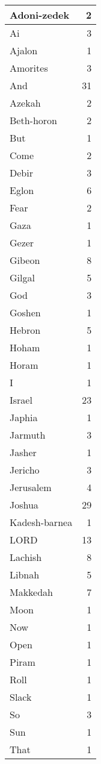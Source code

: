 \begin{center}
\begin{longtable}{l|r}
\hline \hline
\endlastfoot
Adoni-zedek & 2 \\ \hline
Ai & 3 \\ \hline
Ajalon & 1 \\ \hline
Amorites & 3 \\ \hline
And & 31 \\ \hline
Azekah & 2 \\ \hline
Beth-horon & 2 \\ \hline
But & 1 \\ \hline
Come & 2 \\ \hline
Debir & 3 \\ \hline
Eglon & 6 \\ \hline
Fear & 2 \\ \hline
Gaza & 1 \\ \hline
Gezer & 1 \\ \hline
Gibeon & 8 \\ \hline
Gilgal & 5 \\ \hline
God & 3 \\ \hline
Goshen & 1 \\ \hline
Hebron & 5 \\ \hline
Hoham & 1 \\ \hline
Horam & 1 \\ \hline
I & 1 \\ \hline
Israel & 23 \\ \hline
Japhia & 1 \\ \hline
Jarmuth & 3 \\ \hline
Jasher & 1 \\ \hline
Jericho & 3 \\ \hline
Jerusalem & 4 \\ \hline
Joshua & 29 \\ \hline
Kadesh-barnea & 1 \\ \hline
LORD & 13 \\ \hline
Lachish & 8 \\ \hline
Libnah & 5 \\ \hline
Makkedah & 7 \\ \hline
Moon & 1 \\ \hline
Now & 1 \\ \hline
Open & 1 \\ \hline
Piram & 1 \\ \hline
Roll & 1 \\ \hline
Slack & 1 \\ \hline
So & 3 \\ \hline
Sun & 1 \\ \hline
That & 1 \\ \hline

\end{longtable}
\end{center}
